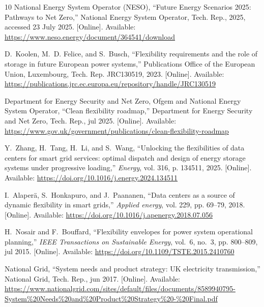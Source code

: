 \documentclass[lettersize,journal]{IEEEtran}
\begin{document}
\begin{thebibliography}{10}
\BIBentryALTinterwordspacing
{National Energy System Operator (NESO)}, ``{Future Energy Scenarios 2025:
  Pathways to Net Zero},'' {National Energy System Operator}, Tech. Rep., 2025,
  accessed 23 July 2025. [Online]. Available:
  \url{https://www.neso.energy/document/364541/download}
\BIBentrySTDinterwordspacing

\BIBentryALTinterwordspacing
D.~Koolen, M.~D. Felice, and S.~Busch, ``{Flexibility requirements and the role
  of storage in future European power systems},'' Publications Office of the
  European Union, Luxembourg, Tech. Rep. JRC130519, 2023. [Online]. Available:
  \url{https://publications.jrc.ec.europa.eu/repository/handle/JRC130519}
\BIBentrySTDinterwordspacing

\BIBentryALTinterwordspacing
{Department for Energy Security and Net Zero, Ofgem and National Energy System
  Operator}, ``{Clean flexibility roadmap},'' {Department for Energy Security
  and Net Zero}, Tech. Rep., jul 2025. [Online]. Available:
  \url{https://www.gov.uk/government/publications/clean-flexibility-roadmap}
\BIBentrySTDinterwordspacing

\BIBentryALTinterwordspacing
Y.~Zhang, H.~Tang, H.~Li, and S.~Wang, ``{Unlocking the flexibilities of data
  centers for smart grid services: optimal dispatch and design of energy
  storage systems under progressive loading},'' \emph{Energy}, vol. 316, p.
  134511, 2025. [Online]. Available:
  \url{https://doi.org/10.1016/j.energy.2024.134511}
\BIBentrySTDinterwordspacing

\BIBentryALTinterwordspacing
I.~Alaper{\"a}, S.~Honkapuro, and J.~Paananen, ``{Data centers as a source of
  dynamic flexibility in smart grids},'' \emph{{Applied energy}}, vol. 229, pp.
  69--79, 2018. [Online]. Available:
  \url{https://doi.org/10.1016/j.apenergy.2018.07.056}
\BIBentrySTDinterwordspacing

\BIBentryALTinterwordspacing
H.~Nosair and F.~Bouffard, ``{Flexibility envelopes for power system
  operational planning},'' \emph{IEEE Transactions on Sustainable Energy},
  vol.~6, no.~3, pp. 800--809, jul 2015. [Online]. Available:
  \url{https://doi.org/10.1109/TSTE.2015.2410760}
\BIBentrySTDinterwordspacing

\BIBentryALTinterwordspacing
{National Grid}, ``{System needs and product strategy: UK electricity
  transmission},'' {National Grid}, Tech. Rep., jun 2017. [Online]. Available:
  \url{https://www.nationalgrid.com/sites/default/files/documents/8589940795-System%20Needs%20and%20Product%20Strategy%20-%20Final.pdf}
\BIBentrySTDinterwordspacing


\end{thebibliography}
\end{document}
